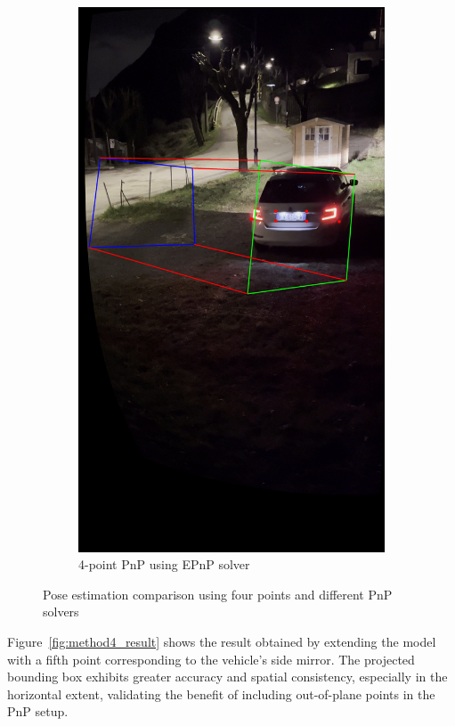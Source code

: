 \begin{figure}[h]
\begin{subfigure}[b]{0.30\textwidth}
        \includegraphics[width=\textwidth]{Images/method4/bbox_4pts_epnp.jpg}
        \caption{4-point PnP using EPnP solver}
    \end{subfigure}
    \hspace*{\fill}
    \caption{Pose estimation comparison using four points and different PnP solvers}
    \label{fig:pnp_4pts}
\end{figure}

Figure~\ref{fig:method4_result} shows the result obtained by extending the model with a fifth point corresponding to the vehicle’s side mirror. The projected bounding box exhibits greater accuracy and spatial consistency, especially in the horizontal extent, validating the benefit of including out-of-plane points in the PnP setup.

